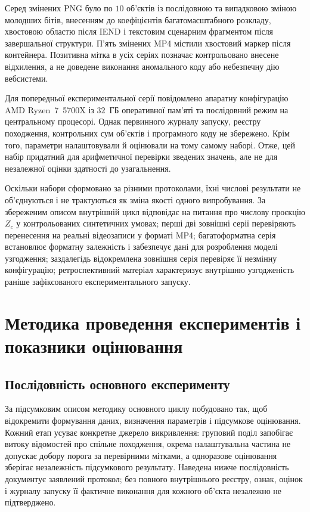 

Серед змінених PNG було по $10$ об’єктів із послідовною та випадковою зміною молодших бітів, внесенням до коефіцієнтів багатомасштабного розкладу, хвостовою областю після IEND і текстовим сценарним фрагментом після завершальної структури. П’ять змінених MP4 містили хвостовий маркер після контейнера. Позитивна мітка в усіх серіях позначає контрольовано внесене відхилення, а не доведене виконання аномального коду або небезпечну дію вебсистеми.

Для попередньої експериментальної серії повідомлено апаратну конфігурацію AMD Ryzen~7~5700X із $32$~ГБ оперативної пам’яті та послідовний режим на центральному процесорі. Однак первинного журналу запуску, реєстру походження, контрольних сум об’єктів і програмного коду не збережено. Крім того, параметри налаштовували й оцінювали на тому самому наборі. Отже, цей набір придатний для арифметичної перевірки зведених значень, але не для незалежної оцінки здатності до узагальнення.

Оскільки набори сформовано за різними протоколами, їхні числові результати не об’єднуються і не трактуються як зміна якості одного випробування. За збереженим описом внутрішній цикл відповідає на питання про числову проєкцію $Z_c$ у контрольованих синтетичних умовах; перші дві зовнішні серії перевіряють перенесення на реальні відеозаписи у форматі MP4; багатоформатна серія встановлює форматну залежність і забезпечує дані для розроблення моделі узгодження; заздалегідь відокремлена зовнішня серія перевіряє її незмінну конфігурацію; ретроспективний матеріал характеризує внутрішню узгодженість раніше зафіксованого експериментального запуску.

\section{Методика проведення експериментів і показники оцінювання}

\subsection{Послідовність основного експерименту}

За підсумковим описом методику основного циклу побудовано так, щоб відокремити формування даних, визначення параметрів і підсумкове оцінювання. Кожний етап усуває конкретне джерело викривлення: груповий поділ запобігає витоку відомостей про спільне походження, окрема налаштувальна частина не допускає добору порога за перевірними мітками, а одноразове оцінювання зберігає незалежність підсумкового результату. Наведена нижче послідовність документує заявлений протокол; без повного внутрішнього реєстру, ознак, оцінок і журналу запуску її фактичне виконання для кожного об’єкта незалежно не підтверджено.

